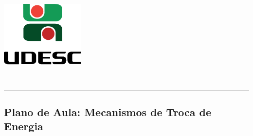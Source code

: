 \thispagestyle{empty}
\begin{center}
	\begin{minipage}[!]{\linewidth}
		\begin{minipage}[!]{.19\linewidth}
			\includegraphics[width=\linewidth]{assets/logo.png}
		\end{minipage}
		\begin{minipage}[!]{.8\linewidth}
			\center
			\ABNTEXchapterfont\normalsize\MakeUppercase{\imprimirinstituicao}
			\par
			\vspace*{10pt}                     
			\ABNTEXchapterfont\normalsize\MakeUppercase{\centro}
			\par
			\vspace*{10pt}           
			\ABNTEXchapterfont\normalsize\MakeUppercase{\disciplina}
		\end{minipage}        
	\end{minipage}
	\\ \vspace{0.5cm}
	\rule{\textwidth}{.5pt}   
\end{center}
\textual
\begin{center}
	\section{Plano de Aula: Mecanismos de Troca de Energia} %
	\label{sec:Plano de Aula: Mecanismos de Troca de Energia}
\end{center}
